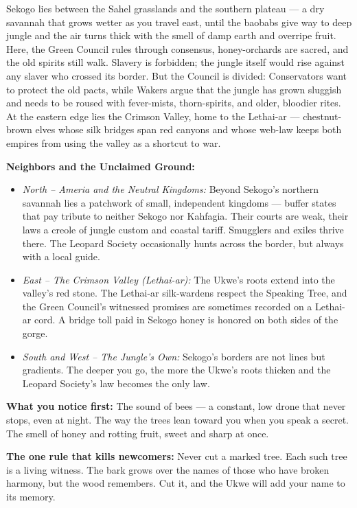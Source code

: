 \vspace{2mm}
\begin{tcolorbox}[colback=black!3,colframe=blue!60!black,title={Theme \& Atmosphere},breakable]
Sekogo lies between the Sahel grasslands and the southern plateau --- a dry savannah that grows wetter as you travel east, until the baobabs give way to deep jungle and the air turns thick with the smell of damp earth and overripe fruit. Here, the Green Council rules through consensus, honey-orchards are sacred, and the old spirits still walk. Slavery is forbidden; the jungle itself would rise against any slaver who crossed its border. But the Council is divided: Conservators want to protect the old pacts, while Wakers argue that the jungle has grown sluggish and needs to be roused with fever-mists, thorn-spirits, and older, bloodier rites. At the eastern edge lies the Crimson Valley, home to the Lethai-ar --- chestnut-brown elves whose silk bridges span red canyons and whose web-law keeps both empires from using the valley as a shortcut to war.

\vspace{2mm}
\textbf{Neighbors and the Unclaimed Ground:}
\begin{itemize}
  \item \textit{North -- Ameria and the Neutral Kingdoms:} Beyond Sekogo's northern savannah lies a patchwork of small, independent kingdoms --- buffer states that pay tribute to neither Sekogo nor Kahfagia. Their courts are weak, their laws a creole of jungle custom and coastal tariff. Smugglers and exiles thrive there. The Leopard Society occasionally hunts across the border, but always with a local guide.
  \item \textit{East -- The Crimson Valley (Lethai-ar):} The Ukwe's roots extend into the valley's red stone. The Lethai-ar silk-wardens respect the Speaking Tree, and the Green Council's witnessed promises are sometimes recorded on a Lethai-ar cord. A bridge toll paid in Sekogo honey is honored on both sides of the gorge.
  \item \textit{South and West -- The Jungle's Own:} Sekogo's borders are not lines but gradients. The deeper you go, the more the Ukwe's roots thicken and the Leopard Society's law becomes the only law.
\end{itemize}

\vspace{2mm}
\textbf{What you notice first:} The sound of bees --- a constant, low drone that never stops, even at night. The way the trees lean toward you when you speak a secret. The smell of honey and rotting fruit, sweet and sharp at once.

\textbf{The one rule that kills newcomers:} Never cut a marked tree. Each such tree is a living witness. The bark grows over the names of those who have broken harmony, but the wood remembers. Cut it, and the Ukwe will add your name to its memory.
\end{tcolorbox}

